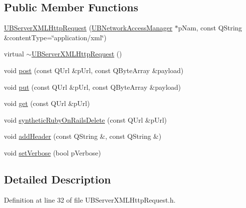 \subsection*{Public Member Functions}
\begin{DoxyCompactItemize}
\item 
\hyperlink{class_u_b_server_x_m_l_http_request_a0fd99f0fbcd42473bf5b04c695586472}{U\-B\-Server\-X\-M\-L\-Http\-Request} (\hyperlink{class_u_b_network_access_manager}{U\-B\-Network\-Access\-Manager} $\ast$p\-Nam, const Q\-String \&content\-Type=\char`\"{}application/xml\char`\"{})
\item 
virtual \hyperlink{class_u_b_server_x_m_l_http_request_a503cf72c82ee9a2e652e152d462d4b60}{$\sim$\-U\-B\-Server\-X\-M\-L\-Http\-Request} ()
\item 
void \hyperlink{class_u_b_server_x_m_l_http_request_ae3b7956d7cbf7f8bf391813a301c1079}{post} (const Q\-Url \&p\-Url, const Q\-Byte\-Array \&payload)
\item 
void \hyperlink{class_u_b_server_x_m_l_http_request_ae49f19360175e085bdd6b2469381fd36}{put} (const Q\-Url \&p\-Url, const Q\-Byte\-Array \&payload)
\item 
void \hyperlink{class_u_b_server_x_m_l_http_request_a113f3c231a3e1661d6ddf81e02f23c98}{get} (const Q\-Url \&p\-Url)
\item 
void \hyperlink{class_u_b_server_x_m_l_http_request_a8dd68f1d947a38d3159a09ea80b451a0}{synthetic\-Ruby\-On\-Rails\-Delete} (const Q\-Url \&p\-Url)
\item 
void \hyperlink{class_u_b_server_x_m_l_http_request_a3eeea30fb3afc00305f0b050e64db1aa}{add\-Header} (const Q\-String \&, const Q\-String \&)
\item 
void \hyperlink{class_u_b_server_x_m_l_http_request_a6bc3fcbabc21855cd7ca127bee77fb5d}{set\-Verbose} (bool p\-Verbose)
\end{DoxyCompactItemize}


\subsection{Detailed Description}


Definition at line 32 of file U\-B\-Server\-X\-M\-L\-Http\-Request.\-h.



